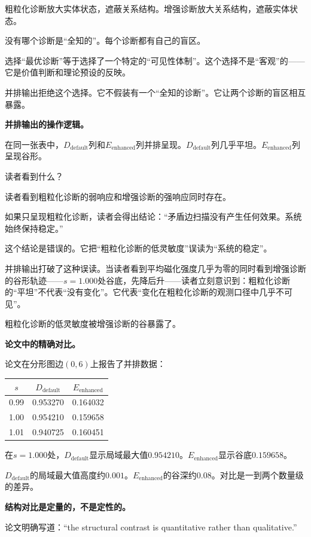 \documentclass[11pt,a4paper]{book}
\theoremstyle{definition}
\begin{document}
粗粒化诊断放大实体状态，遮蔽关系结构。增强诊断放大关系结构，遮蔽实体状态。

没有哪个诊断是“全知的”。每个诊断都有自己的盲区。

选择“最优诊断”等于选择了一个特定的“可见性体制”。这个选择不是“客观”的——它是价值判断和理论预设的反映。

并排输出拒绝这个选择。它不假装有一个“全知的诊断”。它让两个诊断的盲区相互暴露。

\textbf{并排输出的操作逻辑。}

在同一张表中，$D_{\text{default}}$列和$E_{\text{enhanced}}$列并排呈现。$D_{\text{default}}$列几乎平坦。$E_{\text{enhanced}}$列呈现谷形。

读者看到什么？

读者看到粗粒化诊断的弱响应和增强诊断的强响应同时存在。

如果只呈现粗粒化诊断，读者会得出结论：“矛盾边扫描没有产生任何效果。系统始终保持稳定。”

这个结论是错误的。它把“粗粒化诊断的低灵敏度”误读为“系统的稳定”。

并排输出打破了这种误读。当读者看到平均磁化强度几乎为零的同时看到增强诊断的谷形轨迹——$s=1.000$处谷底，先降后升——读者立刻意识到：粗粒化诊断的“平坦”不代表“没有变化”。它代表“变化在粗粒化诊断的观测口径中几乎不可见”。

粗粒化诊断的低灵敏度被增强诊断的谷暴露了。

\textbf{论文中的精确对比。}

论文在分形图边$(0,6)$上报告了并排数据：

\begin{table}[h]
\centering
\begin{tabular}{ccc}
\toprule
$s$ & $D_{\text{default}}$ & $E_{\text{enhanced}}$ \\
\midrule
0.99 & 0.953270 & 0.164032 \\
1.00 & 0.954210 & 0.159658 \\
1.01 & 0.940725 & 0.160451 \\
\bottomrule
\end{tabular}
\end{table}

在$s=1.000$处，$D_{\text{default}}$显示局域最大值$0.954210$。$E_{\text{enhanced}}$显示谷底$0.159658$。

$D_{\text{default}}$的局域最大值高度约$0.001$。$E_{\text{enhanced}}$的谷深约$0.08$。对比是一到两个数量级的差异。

\textbf{结构对比是定量的，不是定性的。}

论文明确写道：“the structural contrast is quantitative rather than qualitative.”
\end{document}
